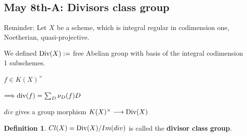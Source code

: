 \documentclass[11pt]{article}
\theoremstyle{definition}
\newtheorem{dfn}[thm]{Definition}
\renewcommand{\div}{\textnormal{div}}
\newcommand{\Div}{\textnormal{Div}}
\newcommand{\Lrta}{\Longrightarrow}
\newcommand{\lrta}{\longrightarrow}
\begin{document}
\subsection{May 8th-A: Divisors class group}

Reminder:
 Let $X$ be a scheme, which is integral regular in codimension one, Noetherian, quasi-projective.

 We defined $\Div(X):=$ free Abelian group with basis of the integral codimension 1 subschemes.

 $f\in K(X)^\times$

 $\Lrta \div(f)=\sum_D \nu_D(f)D$
 
 $div$ gives a group morphism $K(X)^\times\lrta \Div(X)$

\begin{dfn}
$Cl(X)=\Div(X)/Im(div)$ is called the \textbf{divisor class group}.
\end{dfn}
\end{document}
